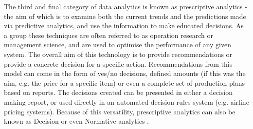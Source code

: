 The third and final category of data analytics is known as prescriptive analytics - the aim of which is to examine both the current trends and the predictions made via predictive analytics, and use the information to make educated decisions. As a group these techniques are often referred to as operation research or management science, and are used to optimise the performance of any given system. The overall aim of this technology is to provide recommendations or provide a concrete decision for a specific action. Recommendations from this model can come in the form of yes/no decisions, defined amounts (if this was the aim, e.g. the price for a specific item) or even a complete set of production plans based on reports. The decisions created can be presented in either a decision making report, or used directly in an automated decision rules system (e.g. airline pricing systems). Because of this versatility, prescriptive analytics can also be known as Decision or even Normative analytics \cite{davenport2007competing}. 

